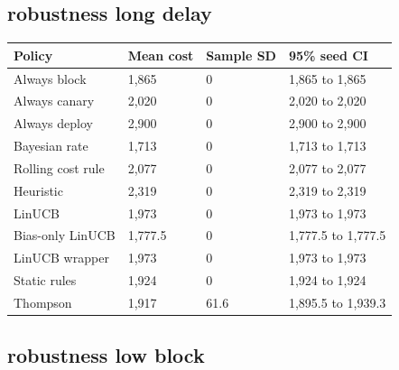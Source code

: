 \documentclass[
  10pt,
]{article}
\begin{document}
\subsection{robustness long delay}\label{robustness-long-delay}

\par\medskip\noindent\begin{minipage}{\linewidth}\centering
\begin{tabular}{@{}llll@{}}
\toprule\noalign{}
Policy & Mean cost & Sample SD & 95\% seed CI \\
\midrule\noalign{}
Always block & 1,865 & 0 & 1,865 to 1,865 \\
Always canary & 2,020 & 0 & 2,020 to 2,020 \\
Always deploy & 2,900 & 0 & 2,900 to 2,900 \\
Bayesian rate & 1,713 & 0 & 1,713 to 1,713 \\
Rolling cost rule & 2,077 & 0 & 2,077 to 2,077 \\
Heuristic & 2,319 & 0 & 2,319 to 2,319 \\
LinUCB & 1,973 & 0 & 1,973 to 1,973 \\
Bias-only LinUCB & 1,777.5 & 0 & 1,777.5 to 1,777.5 \\
LinUCB wrapper & 1,973 & 0 & 1,973 to 1,973 \\
Static rules & 1,924 & 0 & 1,924 to 1,924 \\
Thompson & 1,917 & 61.6 & 1,895.5 to 1,939.3 \\
\bottomrule
\end{tabular}
\end{minipage}\par\medskip

\subsection{robustness low block}\label{robustness-low-block}
\end{document}
